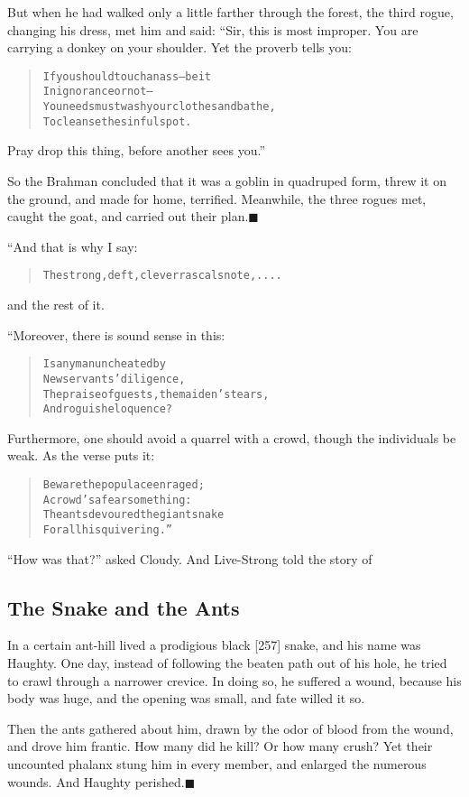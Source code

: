 \documentclass[article, twoside, 14pt]{memoir}
\newcommand{\qed}{\hfill \ensuremath{\blacksquare}}
\renewenvironment{verbatim}{%
\begin{quote}%
\vskip -10pt%
\begin{alltt}\normalfont\large}{\end{alltt}%
\end{quote}%
\vskip -10pt
} %
\begin{document}
But when he had walked only a little farther through the forest,
the third rogue, changing his dress, met him and said: “Sir, this
is most improper. You are carrying a donkey on your shoulder. Yet
the proverb tells you:

\begin{verbatim}
If you should touch an ass--be it
    In ignorance or not--
You needs must wash your clothes and bathe,
    To cleanse the sinful spot.
\end{verbatim}
Pray drop this thing, before another sees you.”

So the Brahman concluded that it was a goblin in quadruped form,
threw it on the ground, and made for home, terrified. Meanwhile,
the three rogues met, caught the goat, and carried out their
plan.\hyperref[s51]{\qed}

“And that is why I say:

\begin{verbatim}
The strong, deft, clever rascals note, ....
\end{verbatim}
and the rest of it.

“Moreover, there is sound sense in this:

\begin{verbatim}
Is any man uncheated by
    New servants’ diligence,
The praise of guests, the maiden’s tears,
    And roguish eloquence?
\end{verbatim}
Furthermore, one should avoid a quarrel with a crowd, though the
individuals be weak. As the verse puts it:

\begin{verbatim}
Beware the populace enraged;
    A crowd's a fearsome thing:
The ants devoured the giant snake
    For all his quivering.”
\end{verbatim}
``How was that?'' asked Cloudy. And Live-Strong told the story of

\subsection{The Snake and the Ants}

\label{s52}

In a certain ant-hill lived a prodigious black [257] snake, and his
name was Haughty. One day, instead of following the beaten path out
of his hole, he tried to crawl through a narrower crevice. In doing
so, he suffered a wound, because his body was huge, and the opening
was small, and fate willed it so.

Then the ants gathered about him, drawn by the odor of blood from
the wound, and drove him frantic. How many did he kill? Or how many
crush? Yet their uncounted phalanx stung him in every member, and
enlarged the numerous wounds. And Haughty
perished.\hyperref[s52]{\qed}
\end{document}
